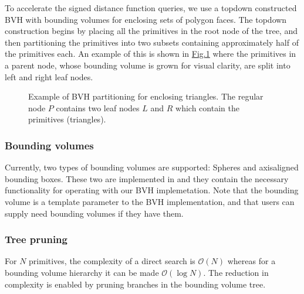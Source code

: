 \documentclass[letterpaper,10pt,english]{sphinxmanual}
\let\sphinxpxdimen\pdfpxdimen\else\newdimen\sphinxpxdimen
\begin{document}
To accelerate the signed distance function queries, we use a top\sphinxhyphen{}down constructed BVH with bounding volumes for enclosing sets of polygon faces.
The top\sphinxhyphen{}down construction begins by placing all the primitives in the root node of the tree, and then partitioning the primitives into two subsets containing approximately half of the primitives each.
An example of this is shown in \hyperref[\detokenize{Utilities/ComplexGeometries:fig-trianglesbvh}]{Fig.\@ \ref{\detokenize{Utilities/ComplexGeometries:fig-trianglesbvh}}} where the primitives in a parent node, whose bounding volume is grown for visual clarity, are split into left and right leaf nodes.

\begin{figure}[htb]
\centering
\capstart

\noindent\sphinxincludegraphics[width=480\sphinxpxdimen]{{TrianglesBVH}.png}
\caption{Example of BVH partitioning for enclosing triangles. The regular node \(P\) contains two leaf nodes \(L\) and \(R\) which contain the primitives (triangles).}\label{\detokenize{Utilities/ComplexGeometries:id5}}\label{\detokenize{Utilities/ComplexGeometries:fig-trianglesbvh}}\end{figure}


\subsubsection{Bounding volumes}
\label{\detokenize{Utilities/ComplexGeometries:bounding-volumes}}
Currently, two types of bounding volumes are supported: Spheres and axis\sphinxhyphen{}aligned bounding boxes.
These two are implemented in  and they contain the necessary functionality for operating with our BVH implemetation.
Note that the bounding volume is a template parameter to the BVH implementation, and that users can supply need bounding volumes if they have them.


\subsubsection{Tree pruning}
\label{\detokenize{Utilities/ComplexGeometries:tree-pruning}}
For \(N\) primitives, the complexity of a direct search is \(\mathcal{O}\left(N\right)\) whereas for a bounding volume hierarchy it can be made \(\mathcal{O}\left(\log N\right)\).
The reduction in complexity is enabled by pruning branches in the bounding volume tree.
\end{document}
